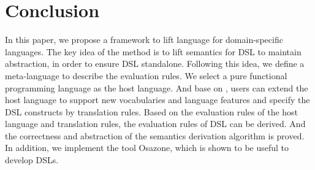 \section{Conclusion}

In this paper, we propose a framework to lift language for domain-specific languages.
The key idea of the method is to lift semantics for DSL to maintain abstraction,
 in order to ensure DSL standalone.
Following this idea, we define a meta-language to describe the evaluation rules.
We select a pure functional programming language \STLC{} as the host language.
And base on \STLC, users can extend the host language to support new vocabularies and language features
 and specify the DSL constructs by translation rules.
Based on the evaluation rules of the host language and translation rules, the evaluation rules of DSL can be derived.
And the correctness and abstraction of the semantics derivation algorithm is proved.
In addition, we implement the tool Osazone, which is shown to be useful to develop DSLs.

